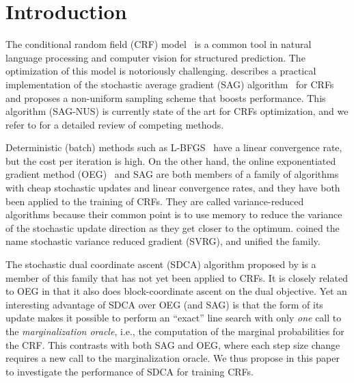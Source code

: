 
\section{Introduction}

The conditional random field (CRF) model~\citep{lafferty2001conditional} is a common tool in natural language processing and computer vision for structured prediction.
The optimization of this model is notoriously challenging.
\citet{schmidt2015non} describes a practical implementation of the stochastic average gradient (SAG) algorithm~\citep{roux2012stochastic} for CRFs and proposes a non-uniform sampling scheme that boosts performance.
This algorithm (SAG-NUS) is currently state of the art for CRFs optimization, and we refer to \citet{schmidt2015non} for a detailed review of competing methods.

Deterministic (batch) methods such as L-BFGS~\citep{sha2003shallow,wallach2002efficient} have a linear convergence rate, but the cost per iteration is high.
On the other hand, the online exponentiated gradient method (OEG)~\citep{collins2008exponentiated} and SAG are both members of a family of algorithms with cheap stochastic updates and linear convergence rates, and they have both been applied to the training of CRFs.
They are called variance-reduced algorithms because their common point is to use memory to reduce the variance of the stochastic update direction as they get closer to the optimum.
\citet{johnson2013accelerating} coined the name stochastic variance reduced gradient (SVRG), and \citet{defazio2014saga} unified the family.

The stochastic dual coordinate ascent (SDCA) algorithm proposed by \citet{shalev-shwartz_stochastic_2013,shalev2016accelerated} is a member of this family that has not yet been applied to CRFs.
It is closely related to OEG in that it also does block-coordinate ascent on the dual objective.
Yet an interesting advantage of SDCA over OEG (and SAG) is that the form of its update makes it possible to perform an ``exact'' line search with only \emph{one} call to the \emph{marginalization oracle}, i.e., the computation of the marginal probabilities for the CRF.
This contrasts with both SAG and OEG, where each step size change requires a new call to the marginalization oracle.
We thus propose in this paper to investigate the performance of SDCA for training CRFs.

